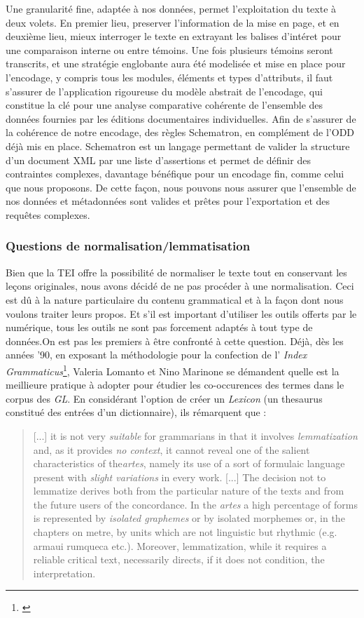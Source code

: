 \documentclass[a4paper, twoside, 12pt]{book}
\begin{document}
Une granularité fine, adaptée à nos données, permet  l'exploitation du texte à deux volets. En premier lieu, preserver l'information de la mise en page, et en deuxième lieu, mieux interroger le texte en extrayant les balises d'intéret pour une comparaison interne ou entre témoins. Une fois plusieurs témoins seront transcrits, et une stratégie englobante aura été modelisée et mise en place pour l'encodage, y compris tous les modules, éléments et types d'attributs, il faut s’assurer de l'application rigoureuse du modèle abstrait de l'encodage, qui constitue la clé pour une analyse comparative cohérente de l'ensemble des données fournies par les éditions documentaires individuelles. Afin de s'assurer de la cohérence de notre encodage, des règles Schematron, en complément de l'ODD déjà mis en place. Schematron est un langage permettant de valider la structure d'un document XML par une liste d'assertions et permet de définir des contraintes complexes, davantage bénéfique pour un encodage fin, comme celui que nous proposons. De cette façon, nous pouvons nous assurer que l'ensemble de nos données et métadonnées sont valides et prêtes pour l'exportation et des requêtes complexes.


\subsubsection{Questions de normalisation/lemmatisation}

Bien que la TEI offre la possibilité de normaliser le texte tout en conservant les leçons originales, nous avons décidé de ne pas procéder à une normalisation. Ceci est dû à la nature particulaire du contenu grammatical et à la façon dont nous voulons traiter leurs propos. Et s'il est important d'utiliser les outils offerts par le numérique, tous les outils ne sont pas forcement adaptés à tout type de données.On est pas les premiers à être confronté à cette question. Déjà, dès les années '90, en exposant la méthodologie pour la confection de l' \textit{Index Grammaticus}\footnote{\cite{lomanto1990concordance}}, Valeria Lomanto et Nino Marinone se démandent quelle est la meillieure pratique à adopter pour étudier les co-occurences des termes dans le corpus des \textit{GL}. En considérant l'option de créer un \textit{Lexicon} (un thesaurus constitué des entrées d'un dictionnaire), ils rémarquent que : \blockquote{[...] it is not very \textit{suitable} for grammarians in that it involves \textit{lemmatization} and, as it provides \textit{no context}, it cannot reveal one of the salient characteristics of the\textit{artes}, namely its use of a sort of formulaic language present with \textit{slight variations} in every work. [...] The decision not to lemmatize derives both from the particular nature of the texts and from the future users of the concordance. In the \textit{artes} a high percentage of forms is represented by \textit{isolated graphemes} or by isolated morphemes or, in the chapters on metre, by units which are not linguistic but rhythmic (e.g. armaui rumqueca etc.). Moreover, lemmatization, while it requires a reliable critical text, necessarily
directs, if it does not condition, the interpretation.}
\end{document}

